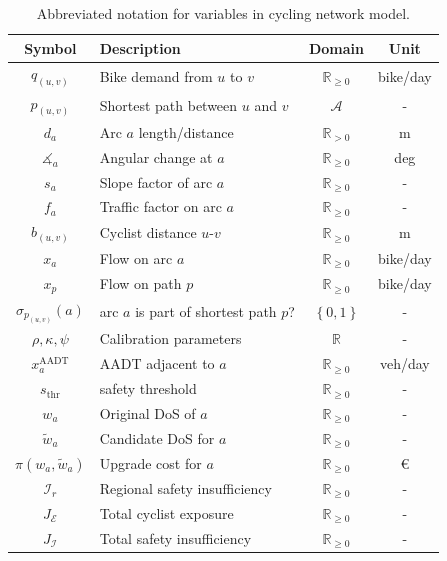 \documentclass[letterpaper, 10 pt, conference]{ieeeconf}  %
\begin{document}
\begin{table}[h!]
\centering
\vspace{0.2cm}
\begin{tabular}{|c|l|c|c|}
\hline
\textbf{Symbol} & \textbf{Description} & \textbf{Domain} & \textbf{Unit} \\ \hline
$q_{(u,v)}$ & Bike demand from $u$ to $v$ & $\mathbb{R}_{\geq 0}$ & bike/day \\
$p_{(u,v)}$ & Shortest path between $u$ and $v$ & $\mathcal{A}$ & - \\ 
$d_{a}$ & Arc $a$ length/distance & $\mathbb{R}_{>0}$ & m \\ 
$\measuredangle_{a}$ & Angular change at $a$ & $\mathbb{R}_{\geq 0}$ & deg \\ 
$s_{a}$ & Slope factor of arc $a$ & $\mathbb{R}_{\geq 0}$ & - \\ 
$f_{a}$ & Traffic factor on arc $a$ & $\mathbb{R}_{\geq 0}$ & - \\ 
$b_{(u,v)}$ & Cyclist distance $u$-$v$ & $\mathbb{R}_{\geq 0}$ & m \\ 
$x_{a}$ & Flow on arc $a$ & $\mathbb{R}_{\geq 0}$ & bike/day \\ 
$x_{p}$ & Flow on path $p$ & $\mathbb{R}_{\geq 0}$ & bike/day \\ 
$\sigma_{p_{(u,v)}}(a)$ & arc $a$ is part of shortest path $p$? & $ \left\{ 0,1\right\}$ & - \\ 
$\rho, \kappa, \psi$ & Calibration parameters & $\mathbb{R}$ & - \\ 
$x^{\text{AADT}}_{a}$ & AADT adjacent to $a$ & $\mathbb{R}_{\geq 0}$ & veh/day \\ 
$s_{\text{thr}}$ & safety threshold & $\mathbb{R}_{\geq 0}$ & - \\ 
$w_{a}$ & Original DoS of $a$ & $\mathbb{R}_{\geq 0}$ & - \\ 
$\tilde{w}_{a}$ & Candidate DoS for $a$ & $\mathbb{R}_{\geq 0}$ & - \\ 
$\pi(w_{a},\tilde{w}_{a})$ & Upgrade cost for $a$ & $\mathbb{R}_{\geq 0}$ & € \\ 
$\mathcal{I}_{r}$ & Regional safety insufficiency & $\mathbb{R}_{\geq 0}$ & - \\ 
$J_{\mathcal{E}}$ & Total cyclist exposure & $\mathbb{R}_{\geq 0}$ & -\\
$J_{\mathcal{I}}$ & Total safety insufficiency & $\mathbb{R}_{\geq 0}$ & - \\ 
\hline
\end{tabular}
\caption{\footnotesize Abbreviated notation for variables in cycling network model.}
\label{table:notation_summary}
\end{table}
\end{document}
